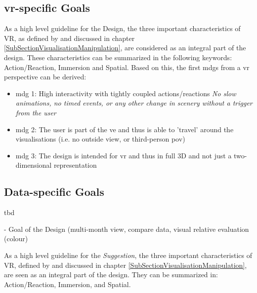 \subsection{\gls{vr}-specific Goals}

As a high level guideline for the Design, the three important characteristics of VR, as defined by \cite{Stone1994} and discussed in chapter \ref{SubSectionVisualisationManipulation}, are considered as an integral part of the design. These characteristics can be summarized in the following keywords: Action/Reaction, Immersion and Spatial. Based on this, the first \glspl{mdg} from a \gls{vr} perspective can be derived:
\begin{itemize}[noitemsep,nolistsep]
	\item \gls{mdg} 1: High interactivity with tightly coupled actions/reactions \newline \textit{No slow animations, no timed events, or any other change in scenery without a trigger from the user}
	\item \gls{mdg} 2: The user is part of the \gls{ve} and thus is able to 'travel' around the visualisations (i.e. no outside view, or third-person \gls{pov})
	\item \gls{mdg} 3: The design is intended for \gls{vr} and thus in full 3D and not just a two-dimensional representation
\end{itemize}





\subsection{Data-specific Goals}

tbd

- Goal of the Design (multi-month view, compare data, visual relative evaluation (colour)

As a high level guideline for the \textit{Suggestion}, the three important characteristics of VR, defined by \cite{Stone1994} and discussed in chapter \ref{SubSectionVisualisationManipulation}, are seen as an integral part of the design. They can be summarized in: Action/Reaction, Immersion, and Spatial. \newline




